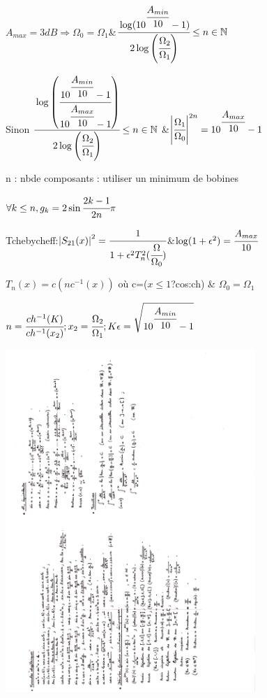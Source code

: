 \documentclass[10pt,a4paper]{article}
\begin{document}
\begin{multicols}{2}
$A_{max} = 3dB \Rightarrow \Omega_0=\Omega_1$\&$\cfrac{\log(10^{\cfrac{A_{min}}{10}}-1)}{2\log\left(\cfrac{\Omega_2}{\Omega_1}\right)} \leq n \in \mathbb{N}$

Sinon $\cfrac{\log\left(\cfrac{10^{\cfrac{A_{min}}{10}}-1}{10^{\cfrac{A_{max}}{10}}-1}\right)}{2\log\left(\cfrac{\Omega_2}{\Omega_1}\right)} \leq n \in \mathbb{N}$ \&$\left|\cfrac{\Omega_1}{\Omega_0}\right|^{2n} = 10^{\cfrac{A_{max}}{10}}-1$

n : nbde composants : utiliser un minimum de bobines

$\forall k \leq n,g_k=2\sin\cfrac{2k-1}{2n}\pi$

Tchebycheff:$\left|S_{21}(x)\right|^2 = \cfrac{1}{1+\epsilon^2T_n^2(\cfrac{\Omega}{\Omega_0})}$\&$\log(1+\epsilon^2)=\cfrac{A_{max}}{10}$

$T_n(x) = c\left(nc^{-1}(x)\right)$ où c=($x\leq1$?cos:ch) \& $\Omega_0 = \Omega_1$

$n=\cfrac{ch^{-1}(K)}{ch^{-1}(x_2)};x_2=\cfrac{\Omega_2}{\Omega_1};K\epsilon=\sqrt{10^{\cfrac{A_{min}}{10}}-1}$


\end{multicols}

\includegraphics[height=13cm]{../trigo/trigo}
\end{document}
